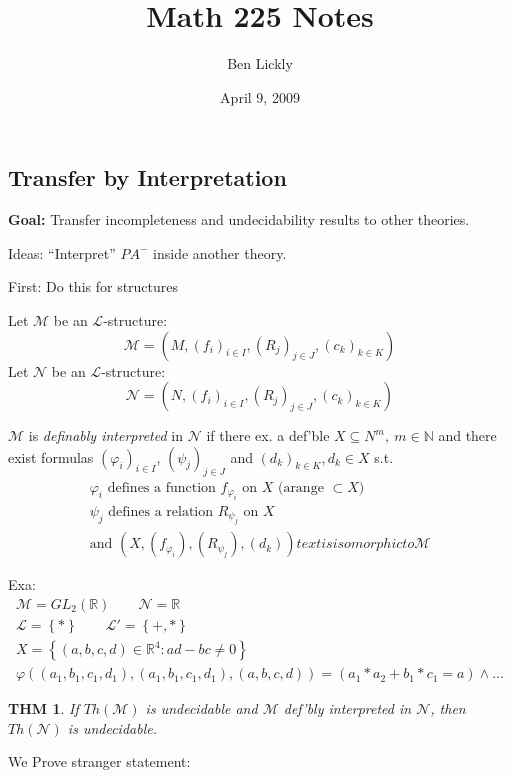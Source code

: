 \documentclass[12pt]{article}
\author{Ben Lickly}
\date{April 9, 2009}
\title{Math 225 Notes}
\newcommand{\Nat}{\ensuremath{\mathbb{N}}}
\newcommand{\Real}{\ensuremath{\mathbb{R}}}
\begin{document}
\maketitle

\subsection*{Transfer by Interpretation}

\textbf{Goal:} Transfer incompleteness and undecidability results to other
theories.

Ideas: ``Interpret'' $PA^-$ inside another theory.

First: Do this for structures

Let $\mathcal{M}$ be an $\mathcal{L}$-structure:
\[
\mathcal{M} = \left( M, (f_i)_{i\in I}, (R_j)_{j\in J},
                                          (c_k)_{k \in K} \right)
\]
Let $\mathcal{N}$ be an $\mathcal{L}$-structure:
\[
\mathcal{N} = \left( N, (f_i)_{i\in I}, (R_j)_{j\in J},
                                        (c_k)_{k \in K} \right)
\]


$\mathcal{M}$ is \emph{definably interpreted} in $\mathcal{N}$ if there ex.
a def'ble $X \subseteq N^m,\ m \in \Nat$
and there exist formulas
$(\varphi_i)_{i\in I}$, $(\psi_j)_{j\in J}$ and $(d_k)_{k\in K}, d_k \in X$
s.t.
\begin{align*}
  \varphi_i \text{ defines a function $f_{\varphi_i}$ on $X$ (arange $\subset X$)} \\ 
  \psi_j \text{ defines a relation $R_{\psi_j}$ on $X$} \\ 
  \text{and } \left( X, (f_{\varphi_i}), (R_{\psi_j}), (d_k) \right)
        text{ is isomorphic to } \mathcal{M}
\end{align*}

Exa:
\begin{align*}
\mathcal{M} = GL_2(\Real)
\qquad
\mathcal{N} = \Real
\\
\mathcal{L} = \left\{ * \right\}
\qquad
\mathcal{L}' = \left\{ +, * \right\}
\\
X = \left\{ (a, b, c, d) \in \Real^4 : ad - bc \ne 0 \right\}
\\
\varphi \left((a_1, b_1, c_1, d_1), (a_1, b_1, c_1, d_1), (a, b, c, d) \right)
        = (a_1 * a_2 + b_1 * c_1 = a) \wedge \dots
\end{align*}

\newtheorem*{defintrundec}{THM}
\begin{defintrundec}
  If $Th(\mathcal{M})$ is undecidable and $\mathcal{M}$ def'bly interpreted in
  $\mathcal{N}$, then $Th(\mathcal{N})$ is undecidable.
\end{defintrundec}
  We Prove stranger statement:
\end{document}
